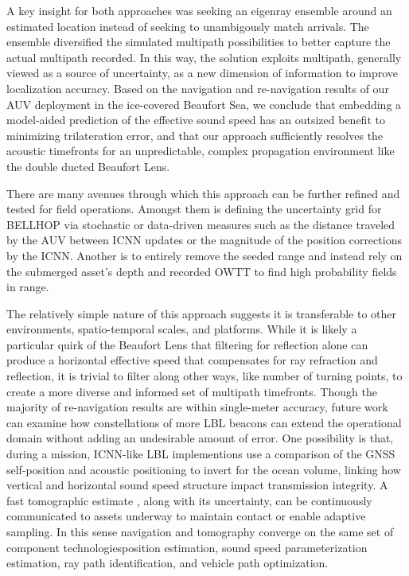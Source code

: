 A key insight for both approaches was seeking an eigenray ensemble around an estimated location instead of seeking to unambigously match arrivals.
The ensemble diversified the simulated multipath possibilities to better capture the actual multipath recorded.
In this way, the solution exploits multipath, generally viewed as a source of uncertainty, as a new dimension of information to improve localization accuracy.
Based on the navigation and re-navigation results of our AUV deployment in the ice-covered Beaufort Sea, we conclude that embedding a model-aided prediction of the effective sound speed has an outsized benefit to minimizing trilateration error, and that our approach sufficiently resolves the acoustic timefronts for an unpredictable, complex propagation environment like the double ducted Beaufort Lens.

There are many avenues through which this approach can be further refined and tested for field operations.
Amongst them is defining the uncertainty grid for BELLHOP via stochastic or data-driven measures such as the distance traveled by the AUV between ICNN updates or the magnitude of the position corrections by the ICNN.
Another is to entirely remove the seeded range and instead rely on the submerged asset's depth and recorded OWTT to find high probability fields in range.

The relatively simple nature of this approach suggests it is transferable to other environments, spatio-temporal scales, and platforms.
While it is likely a particular quirk of the Beaufort Lens that filtering for reflection alone can produce a horizontal effective speed that compensates for ray refraction and reflection, it is trivial to filter along other ways, like number of turning points, to create a more diverse and informed set of multipath timefronts.
Though the majority of re-navigation results are within single-meter accuracy, future work can examine how constellations of more LBL beacons can extend the operational domain without adding an undesirable amount of error.
One possibility is that, during a mission, ICNN-like LBL implementions use a comparison of the GNSS self-position and acoustic positioning to invert for the ocean volume, linking how vertical and horizontal sound speed structure impact transmission integrity.
 A fast tomographic estimate \citep{deffenbaugh_optimal_1997,Elisseeff2002}, along with its uncertainty, can be continuously communicated to assets underway to maintain contact or enable adaptive sampling.
In this sense navigation and tomography converge on the same set of component technologies\textemdash position estimation, sound speed parameterization estimation, ray path identification, and vehicle path optimization.

